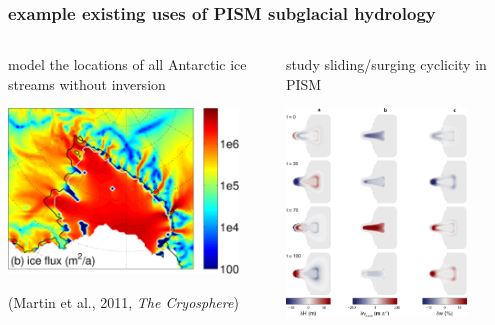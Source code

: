\documentclass[hide notes,intlimits]{beamer}
\begin{document}
\begin{frame}
  \frametitle{example existing uses of PISM subglacial hydrology}

\begin{columns}
\begin{column}{0.5\textwidth}
\begin{center}
model the locations of all Antarctic ice streams without inversion

\vspace{13mm}

\includegraphics[width=0.9\textwidth]{figs/martin-fig12}

\vspace{8mm}

\medskip
\scriptsize (Martin et al., 2011, \emph{The Cryosphere})
\end{center}
\end{column}
\begin{column}{0.5\textwidth}
\begin{center}
study sliding/surging cyclicity in PISM

\bigskip
\includegraphics[width=0.8\textwidth]{figs/vanPeltOerlemans-fig4}


\end{center}
\end{column}
\end{columns}
\end{frame}
\end{document}
